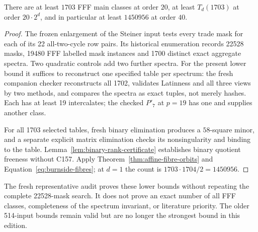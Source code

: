 \begin{computationaltheorem}
\label{cthm:fff20-1703}
There are at least $1703$ FFF main classes at order $20$, at least
$T_d(1703)$ at order $20\cdot2^d$, and in particular at least
$1450956$ at order $40$.
\end{computationaltheorem}

\begin{proof}
The frozen enlargement of the Steiner input tests every trade mask
for each of its 22 all-two-cycle row pairs. Its historical enumeration
records 22528 masks, 19480 FFF labelled mask instances and 1700 distinct
exact aggregate spectra. Two quadratic controls add two further spectra.
For the present lower bound it suffices to reconstruct one specified
table per spectrum: the fresh companion checker reconstructs all 1702,
validates Latinness and all three views by two methods, and compares
the spectra as exact tuples, not merely hashes. Each has at least 19
intercalates; the checked $P'_7$ at $p=19$ has one and supplies another
class.

For all 1703 selected tables, fresh binary elimination produces a
$58$-square minor, and a separate explicit matrix elimination checks
its nonsingularity and binding to the table. Lemma~\ref{lem:binary-rank-certificate}
establishes binary quotient freeness without C157. Apply
Theorem~\ref{thm:affine-fibre-orbits} and
Equation~\eqref{eq:burnside-fibres}; at $d=1$ the count is
$1703\cdot1704/2=1450956$.
\end{proof}

The fresh representative audit proves these lower bounds without
repeating the complete 22528-mask search. It does not prove an exact
number of all FFF classes, completeness of the spectrum invariant,
or literature priority. The older 514-input bounds remain valid but
are no longer the strongest bound in this edition.
